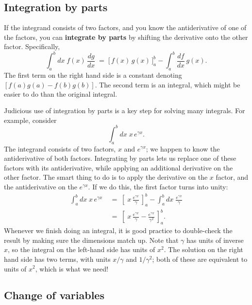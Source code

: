 \documentclass[10pt,a4paper]{article}
\begin{document}
     
\subsection{Integration by parts}

If the integrand consists of two factors, and you know the
antiderivative of one of the factors, you can \textbf{integrate by
parts} by shifting the derivative onto the other factor. Specifically,
\begin{equation}
\int_a^b dx \; f(x) \, \frac{dg}{dx} \;=\; \Big[\,f(x)\, g(x)\,\Big]_a^b - \int_a^b \frac{df}{dx}\, g(x). 
\end{equation}
The first term on the right hand side is a constant denoting
$[f(a)g(a) - f(b)g(b)]$. The second term is an integral, which might
be easier to do than the original integral.

Judicious use of integration by parts is a key step for solving many
integrals. For example, consider
\begin{equation*}
\int_a^b dx\; x \, e^{\gamma x}.
\end{equation*}
The integrand consists of two factors, $x$ and $e^{\gamma x}$; we
happen to know the antiderivative of both factors. Integrating by parts
lets us replace one of these factors with its antiderivative, while
applying an additional derivative on the other factor. The smart thing
to do is to apply the derivative on the $x$ factor, and the
antiderivative on the $e^{\gamma x}$. If we do this, the first factor
turns into unity:
\begin{align}
  \int_a^b dx\; x\, e^{\gamma x} \;&=\; \left[\;x\, \frac{e^{\gamma x}}{\gamma}\, \right]_a^b - \int_a^b dx\; \frac{e^{\gamma x}}{\gamma} \\
  &=\; \left[\;x\, \frac{e^{\gamma x}}{\gamma} - \frac{e^{\gamma x}}{\gamma^2} \,\right]_a^b.
\end{align}
Whenever we finish doing an integral, it is good practice to
double-check the result by making sure the dimensions match up. Note
that $\gamma$ has units of inverse $x$, so the integral on the
left-hand side has units of $x^2$. The solution on the right hand side
has two terms, with units $x/\gamma$ and $1/\gamma^2$; both of these
are equivalent to units of $x^2$, which is what we need!

\subsection{Change of variables}\label{change-of-variables}
\end{document}
